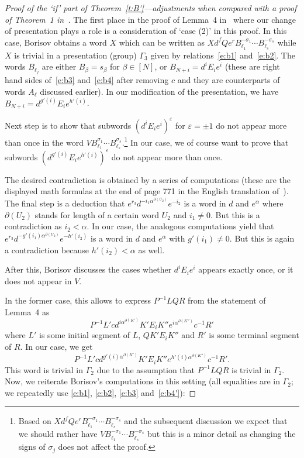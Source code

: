 \documentclass[10pt,a4paper]{article}
\theoremstyle{definition}
\theoremstyle{remark}
\newcommand{\bequal}{$\raisebox{1pt}{$\kern1.5mm
  {\scriptscriptstyle\circ}\kern-2.1mm\rule[-.4mm]{3mm}{.5pt}\kern-3mm\rule[1.2mm]{3mm}{.5pt}\kern1mm$}$}
\begin{document}
\begin{proof}[Proof of the `if' part of Theorem~\ref{t:B'}---adjustments
  when compared with a proof of Theorem~1 in~\cite{borisov69}]
  The first place in the proof of Lemma~4 in~\cite{borisov69} where our change
  of presentation plays a role is a consideration of `case (2)' in this proof.
  In this case, Borisov obtains a word $X$ which can be written as $X \bequal
  d^fQe^r B^{-\sigma_1}_{\ell_1} \cdots B^{-\sigma_s}_{\ell_s}$ while $X$ is
  trivial in a presentation (group) $\Gamma_3$ given by relations~\eqref{e:b1}
  and~\eqref{e:b2}. The words $B_{\ell_j}$ are either $B_\beta = s_\beta$ for
  $\beta \in [N]$, or $B_{N+i} = d^i E_i e^i$ (these are right hand sides
  of~\eqref{e:b3} and~\eqref{e:b4} after removing $c$ and they are counterparts
  of words $A_\ell$ discussed earlier). In our modification of the
  presentation, we have $B_{N+i} = d^{g'(i)} E_i e^{h'(i)}$.

 Next step is to show that subwords $(d^iE_ie^i)^\varepsilon$ for $\varepsilon
 = \pm1$ do not appear more than once in the word $V \bequal
 B^{\sigma_1}_{\ell_1} \cdots B^{\sigma_s}_{\ell_s}$.\footnote{Based on $X \bequal
  d^fQe^r B^{-\sigma_1}_{\ell_1} \cdots B^{-\sigma_s}_{\ell_s}$ and the
  subsequent discussion we expect that we should rather have $V \bequal
 B^{-\sigma_1}_{\ell_1} \cdots B^{-\sigma_s}_{\ell_s}$ but this is a minor
 detail as changing the signs of $\sigma_j$ does not affect the proof.} In our
 case, we of course want to prove that subwords
 $(d^{g'(i)}E_ie^{h'(i)})^\varepsilon$ do not appear more than once.

The desired contradiction is obtained by a series of computations (these are
the displayed math formulas at the end of page 771 in the English translation
of~\cite{borisov69}). The final step is a deduction that $e^{r_3}d^{-i_1
\alpha^{\partial(U_2)}}e^{-i_2}$ is a word in $d$ and $e^{\alpha}$ where
$\partial(U_2)$ stands for length of a certain word $U_2$ and $i_1 \neq 0$. But
this is a contradiction as $i_2 < \alpha$. In our case, the analogous
computations yield that $e^{r_3}d^{-g'(i_1)
\alpha^{\partial(U_2)}}e^{-h'(i_2)}$ is a word in $d$ and $e^{\alpha}$ with
$g'(i_1) \neq 0$. But this is again a contradiction because $h'(i_2) < \alpha$
as well.

After this, Borisov discusses the cases whether $d^i E_i e^i$ appears exactly
once, or it does not appear in $V$.

In the former case, this allows to express $P^{-1}LQR$ from the statement of
Lemma~4 as
\[
  P^{-1} L' cd^{i\alpha^{\partial(K')}}K'E_i K''
  e^{i\alpha^{\partial(K'')}}c^{-1}R'
\]
where $L'$ is some initial segment of $L$, $Q \bequal K'E_iK''$  and $R'$ is
some terminal segment of $R$. In our case, we get
\[
  P^{-1} L' cd^{g'(i)\alpha^{\partial(K')}}K'E_i K''
  e^{h'(i)\alpha^{\partial(K'')}}c^{-1}R'.
\]
This word is trivial in $\Gamma_2$ due to the assumption that $P^{-1}LQR$ is
trivial in $\Gamma_2$. Now, we reiterate Borisov's computations in this
setting (all equalities are in $\Gamma_2$; we repeatedly use \eqref{e:b1},
\eqref{e:b2}, \eqref{e:b3} and~\eqref{e:b4'}):


\end{proof}
\end{document}

